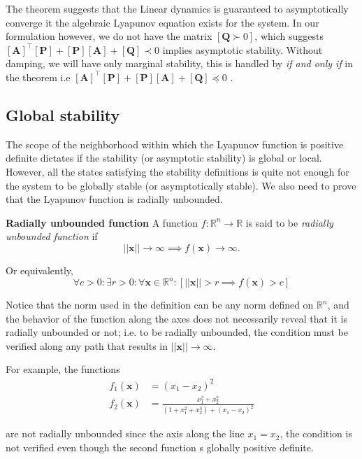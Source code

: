 \documentclass{article}
\begin{document}
The theorem suggests that the Linear dynamics is guaranteed to asymptotically converge it the algebraic Lyapunov equation exists for the system. In our formulation however, we do not have the matrix $[\bm{Q}\succ0]$, which suggests $[\bm{A}]^{\intercal}[\bm{P}]+[\bm{P}][\bm{A}]+[\bm{Q}]\prec0$ implies asymptotic stability. Without damping, we will have only marginal stability, this is handled by \textit{if and only if} in the theorem i.e $[\bm{A}]^{\intercal}[\bm{P}]+[\bm{P}][\bm{A}]+[\bm{Q}]\preceq0$ .

\subsection{Global stability}
The scope of the neighborhood within which the Lyapunov function is positive definite dictates if the stability (or asymptotic stability) is global or local. However, all the states satisfying the stability definitions is quite not enough for the system to be globally stable (or asymptotically stable). We also need to prove that the Lyapunov function is radially unbounded.

\textbf{Radially unbounded function} A function $f:\mathbb{R}^{n}\rightarrow\mathbb{R}$ is said to be \textit{radially unbounded function} if $$|\!|\bm{x}|\!|\rightarrow\infty\implies f(\bm{x})\rightarrow\infty.$$

Or equivalently,
$$\forall c>0:\exists r>0:\forall \bm{x}\in\mathbb{R}^{n}:[|\!|\bm{x}|\!|>r\implies f(\bm{x})>c]$$

Notice that the norm used in the definition can be any norm defined on $\mathbb{R}^{n}$, and the behavior of the function along the axes does not necessarily reveal that it is radially unbounded or not; i.e. to be radially unbounded, the condition must be verified along any path that results in $|\!|\bm{x}|\!|\rightarrow\infty$.

For example, the functions
\begin{equation*}
  \begin{split}
    f_{1}(\bm{x})&=(x_{1}-x_{2})^{2}\\
    f_{2}(\bm{x})&=\frac{x_{1}^{2}+x_{2}^{2}}{(1+x_{1}^{2}+x_{2}^{3})+(x_{1}-x_{2})^{2}}    
  \end{split}
\end{equation*}

are not radially unbounded since the axis along the line $x_{1}=x_{2}$, the condition is not verified even though the second function s globally positive definite.
\end{document}
